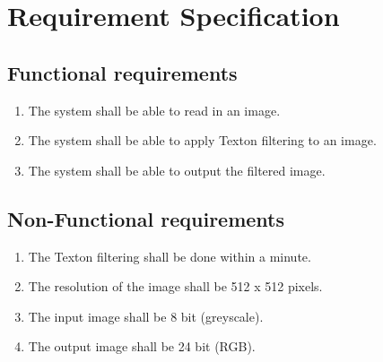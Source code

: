 \chapter{Requirement Specification}


\section{Functional requirements}
\begin{enumerate}[label=1.\arabic*]
	\item The system shall be able to read in an image.
	\item The system shall be able to apply Texton filtering to an image.
	\item The system shall be able to output the filtered image.
\end{enumerate}


\section{Non-Functional requirements}
\begin{enumerate}[label=2.\arabic*]
	\item The Texton filtering shall be done within a minute.
	\item The resolution of the image shall be 512 x 512 pixels.
	\item The input image shall be 8 bit (greyscale).
	\item The output image shall be 24 bit (RGB).
\end{enumerate}